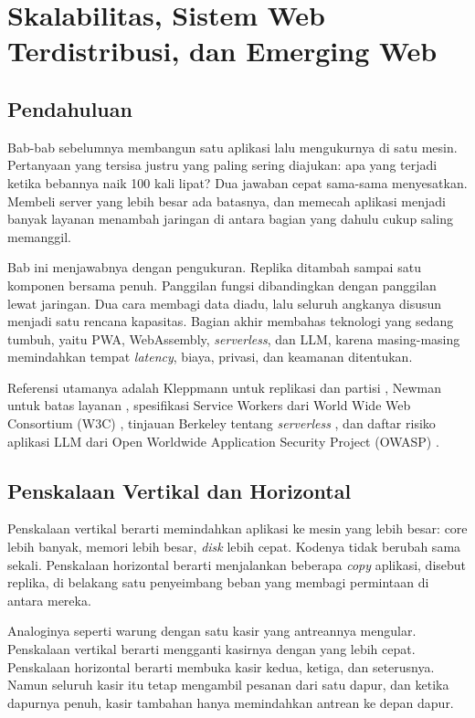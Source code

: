 \chapter{Skalabilitas, Sistem Web Terdistribusi, dan Emerging Web}
\label{ch:skala}

\section{Pendahuluan}

Bab-bab sebelumnya membangun satu aplikasi lalu mengukurnya di satu mesin.
Pertanyaan yang tersisa justru yang paling sering diajukan: apa yang terjadi
ketika bebannya naik 100 kali lipat? Dua jawaban cepat sama-sama menyesatkan.
Membeli server yang lebih besar ada batasnya, dan memecah aplikasi menjadi
banyak layanan menambah jaringan di antara bagian yang dahulu cukup saling
memanggil.

Bab ini menjawabnya dengan pengukuran. Replika ditambah sampai satu
komponen bersama penuh. Panggilan fungsi dibandingkan dengan panggilan
lewat jaringan. Dua cara membagi data diadu, lalu seluruh angkanya disusun
menjadi satu rencana kapasitas. Bagian akhir membahas teknologi yang sedang
tumbuh, yaitu PWA, WebAssembly, \textit{serverless}, dan LLM, karena
masing-masing memindahkan tempat \textit{latency}, biaya, privasi, dan keamanan
ditentukan.

Referensi utamanya adalah Kleppmann untuk replikasi dan partisi
\cite{kleppmann2017ddia}, Newman untuk batas layanan
\cite{newman2021microservices}, spesifikasi Service Workers dari World Wide
Web Consortium (W3C) \cite{w3c-service-workers}, tinjauan Berkeley tentang
\textit{serverless} \cite{jonas2019serverless}, dan daftar risiko aplikasi
LLM dari Open Worldwide Application Security Project (OWASP)
\cite{owasp-llm-top10}.

\section{Penskalaan Vertikal dan Horizontal}

Penskalaan vertikal berarti memindahkan aplikasi ke mesin yang lebih besar:
core lebih banyak, memori lebih besar, \textit{disk} lebih cepat. Kodenya
tidak berubah sama sekali. Penskalaan horizontal berarti menjalankan beberapa
\textit{copy} aplikasi, disebut replika, di belakang satu penyeimbang beban yang
membagi permintaan di antara mereka.

Analoginya seperti warung dengan satu kasir yang antreannya mengular.
Penskalaan vertikal berarti mengganti kasirnya dengan yang lebih cepat.
Penskalaan horizontal berarti membuka kasir kedua, ketiga, dan seterusnya.
Namun seluruh kasir itu tetap mengambil pesanan dari satu dapur, dan ketika
dapurnya penuh, kasir tambahan hanya memindahkan antrean ke depan dapur.

